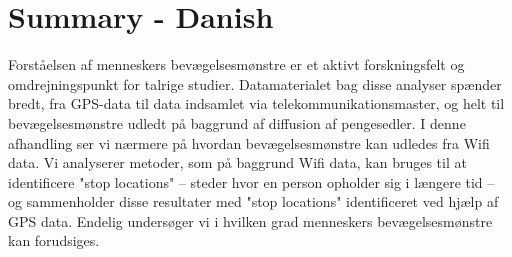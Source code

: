 \chapter{Summary - Danish}

Forståelsen af menneskers bevægelsesmønstre er et aktivt forskningsfelt og
omdrejningspunkt for talrige studier. Datamaterialet bag disse analyser spænder
bredt, fra GPS-data til data indsamlet via telekommunikationsmaster, og helt til
bevægelsesmønstre udledt på baggrund af diffusion af pengesedler. I denne
afhandling ser vi nærmere på hvordan bevægelsesmønstre kan udledes fra Wifi
data. Vi analyserer metoder, som på baggrund Wifi data, kan bruges til at
identificere "stop locations" -- steder hvor en person opholder sig i længere
tid -- og sammenholder disse resultater med "stop locations" identificeret ved
hjælp af GPS data. Endelig undersøger vi i hvilken grad menneskers
bevægelsesmønstre kan forudsiges.
